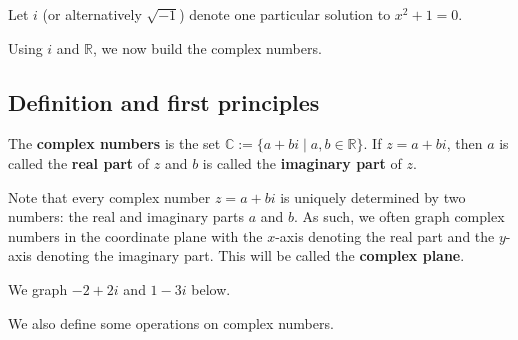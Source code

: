 \begin{definition}
Let $i$ (or alternatively $\sqrt{-1}$) denote one particular solution to $x^2 +1 = 0$. 
\end{definition}

 Using $i$ and $\mathbb{R}$, we now build the complex numbers.

\subsection{Definition and first principles}

\begin{definition}
The \textbf{complex numbers} is the set $\mathbb{C} := \{a + bi\mid a,b \in \mathbb{R}\}$. If $z=a+bi$, then $a$ is called the \textbf{real part} of $z$ and $b$ is called the \textbf{imaginary part} of $z$.
\end{definition}

Note that every complex number $z=a+bi$ is uniquely determined by two numbers: the real and imaginary parts $a$ and $b$. As such, we often graph complex numbers in the coordinate plane with the $x$-axis denoting the real part and the $y$-axis denoting the imaginary part. This will be called the \textbf{complex plane}.

\begin{example}
We graph $-2 + 2i$ and  $1 - 3i$ below.
\begin{center}
\end{center}
\end{example}

We also define some operations on complex numbers.

